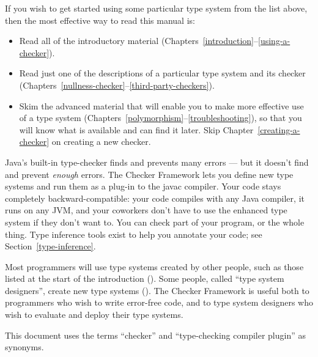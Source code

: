 If you wish to get started using some particular type system from the list
above, then the most effective way to read this manual is:

\begin{itemize}
\item
  Read all of the introductory material
  (Chapters~\ref{introduction}--\ref{using-a-checker}).
\item
  Read just one of the descriptions of a particular type system and its
  checker (Chapters~\ref{nullness-checker}--\ref{third-party-checkers}).
\item
  Skim the advanced material that will enable you to make more effective
  use of a type system
  (Chapters~\ref{polymorphism}--\ref{troubleshooting}), so that you will
  know what is available and can find it later.  Skip
  Chapter~\ref{creating-a-checker} on creating a new checker.
\end{itemize}



Java's built-in type-checker finds and prevents many errors --- but it
doesn't find and prevent \emph{enough} errors.  The Checker Framework lets you
define new type systems and run them as a plug-in to the javac compiler.  Your
code stays completely backward-compatible:  your code compiles with any
Java compiler, it runs on any JVM, and your coworkers don't have to use the
enhanced type system if they don't want to.  You can check part of
your program, or the whole thing.  Type inference tools exist to help you annotate your
code; see Section~\ref{type-inference}.

Most programmers will use type systems created by other people, such as
those listed at the start of the introduction ().
Some people, called ``type system designers'', create new type systems
().
The Checker Framework is useful both to programmers who
wish to write error-free code, and to type system designers who wish to
evaluate and deploy their type systems.

This document uses the terms ``checker'' and ``type-checking compiler
plugin'' as synonyms.


